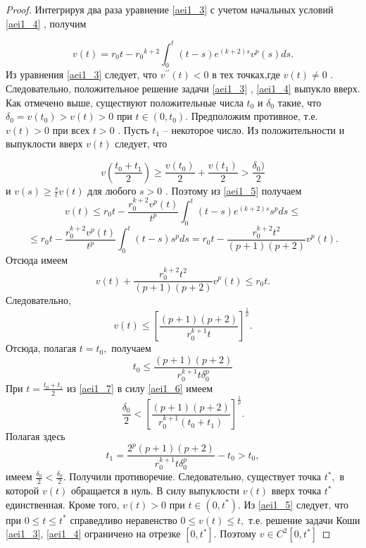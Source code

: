 \begin{proof}
 
Интегрируя два раза уравнение \eqref{aei1_3} 
 с учетом начальных условий \eqref{aei1_4} , получим

\begin{equation}\label{aei1_5}
v(t)=r_0t-{r_0}^{k+2} \int_0^t(t-s)e^{(k+2)s}v^p(s)ds.
\end{equation}
Из уравнения \eqref{aei1_3}  следует, что $ v^{\prime\prime}(t)<0 $ в тех
точках,где $ v(t) \neq 0 $ . 
Следовательно, положительное решение
задачи \eqref{aei1_3} , \eqref{aei1_4}  выпукло вверх. Как отмечено выше, существуют
положительные числа $ t_0 $ и $ \delta_0 $ такие, что $
\delta_0=v(t_0)>v(t)>0 $  при $ t \in (0,t_0)$. Предположим
противное, т.е. $ v(t)>0 $  при всех $ t>0 $ . Пусть $ t_1$ --
некоторое число. Из положительности и выпуклости вверх $ v(t) $
следует, что

\begin{equation}\label{aei1_6}
 v(\frac{t_0+t_1}{2})
\geq \frac{v(t_0)}{2}+\frac{v(t_1)}{2}>\frac{\delta_0)}{2} 
\end{equation}
и $ v(s) \geq \frac {s}{t}v(t) $ для любого $ s>0 $ .
Поэтому из \eqref{aei1_5} получаем
$$
v(t) \leq r_0t-\frac{r_0^{k+2}v^p(t)}{t^p}
\int_0^t(t-s)e^{(k+2)s}s^pds \leq
$$
$$
 \leq r_0t-\frac{r_0^{k+2}v^p(t)}{t^p}
 \int_0^t(t-s)s^pds=
  r_0t-\frac{r_0^{k+2}t^2}{(p+1)(p+2)}v^p(t).
$$
Отсюда имеем
$$
v(t)+\frac{r_0^{k+2}t^2}{(p+1)(p+2)}v^p(t) \leq r_0t.
$$
Следовательно,
\begin{equation}\label{aei1_7}
v(t)
\leq {\left [\frac {(p+1)(p+2)}{r_0^{k+1}t}\right ]}^
{\frac{1}{p}}.   
\end{equation}
Отсюда, полагая $ t=t_0,  $ получаем
$$
t_0 \leq \frac {(p+1)(p+2)}{r_0^{k+1}t\delta_0^p}
$$
При $ t=\frac{t_0+t_1}{2} $ из \eqref{aei1_7} в силу \eqref{aei1_6} имеем
$$
\frac {\delta_0}{2}<
{\left [\frac {(p+1)(p+2)}{r_0^{k+1}(t_0+t_1)}\right ]}^
{\frac{1}{p}}.
$$
Полагая здесь
$$
t_1=\frac {2^p(p+1)(p+2)}{r_0^{k+1}t\delta_0^p}-t_0>t_0,
$$
имеем $ \frac{\delta_0}{2}<\frac{\delta_0}{2}$. 
Получили противоречие. Следовательно, существует точка $ t^*, $
в которой $ v(t) $ обращается в нуль. В силу выпуклости
$ v(t) $  вверх точка $ t^* $  единственная. Кроме того,
$ v(t)>0 $   при $ t \in (0,t^*) $. Из \eqref{aei1_5} следует, что
 при $ 0 \leq t \leq t^* $  справедливо неравенство
$ 0 \leq v(t) \leq t, $ т.е. решение задачи Коши \eqref{aei1_3}, \eqref{aei1_4}
ограничено на отрезке $ [0,t^*] $. Поэтому $ v \in C^2[0,t^*]$
\end{proof}

